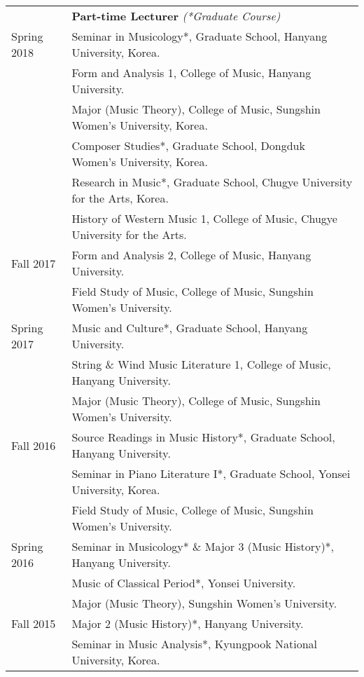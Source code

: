 \documentclass[a4paper,11pt]{article}
\begin{document}
  \hspace*{-0.25cm}
  \begin{tabular}{p{2.5cm} l}
    & \textbf{Part-time Lecturer} \textit{(*Graduate Course)}\\
    Spring 2018 & Seminar in Musicology*, Graduate School, Hanyang University, Korea.\\
    & Form and Analysis 1, College of Music, Hanyang University.\\
    & Major (Music Theory), College of Music, Sungshin Women's University, Korea.\\
    & Composer Studies*, Graduate School, Dongduk Women's University, Korea.\\
    & Research in Music*, Graduate School, Chugye University for the Arts, Korea.\\
    & History of Western Music 1, College of Music, Chugye University for the Arts.\\
    
    Fall 2017 & Form and Analysis 2, College of Music, Hanyang University.\\
    & Field Study of Music, College of Music, Sungshin Women's University.\\

    Spring 2017 & Music and Culture*, Graduate School, Hanyang University.\\
    & String \& Wind Music Literature 1, College of Music, Hanyang University.\\
    & Major (Music Theory), College of Music, Sungshin Women's University.\\
    
    Fall 2016 & Source Readings in Music History*, Graduate School, Hanyang University.\\
    & Seminar in Piano Literature I*, Graduate School, Yonsei University, Korea.\\
    & Field Study of Music, College of Music, Sungshin Women's University.\\
    
    Spring 2016 & Seminar in Musicology* \& Major 3 (Music History)*, Hanyang University.\\
    & Music of Classical Period*, Yonsei University.\\
    & Major (Music Theory), Sungshin Women's University.\\
    
    Fall 2015 & Major 2 (Music History)*, Hanyang University.\\
    & Seminar in Music Analysis*, Kyungpook National University, Korea.\\
    

\end{tabular}
\end{document}
